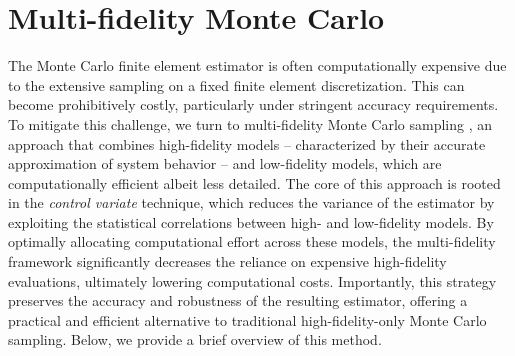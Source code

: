 \section{Multi-fidelity Monte Carlo}\label{sec:MFMC}

The Monte Carlo finite element estimator is often computationally expensive due to the extensive sampling on a fixed finite element discretization. This can become prohibitively costly, particularly under stringent accuracy requirements. To mitigate this challenge, we turn to multi-fidelity Monte Carlo sampling \cite{PeWiGu:2016}, an approach that combines high-fidelity models -- characterized by their accurate approximation of system behavior -- and low-fidelity models, which are computationally efficient albeit less detailed. The core of this approach is rooted in the {\it control variate} technique, which reduces the variance of the estimator by exploiting the statistical correlations between high- and low-fidelity models. By optimally allocating computational effort across these models, the multi-fidelity framework significantly decreases the reliance on expensive high-fidelity evaluations, ultimately lowering computational costs. Importantly, this strategy preserves the accuracy and robustness of the resulting estimator, offering a practical and efficient alternative to traditional high-fidelity-only Monte Carlo sampling. Below, we provide a brief overview of this method.

